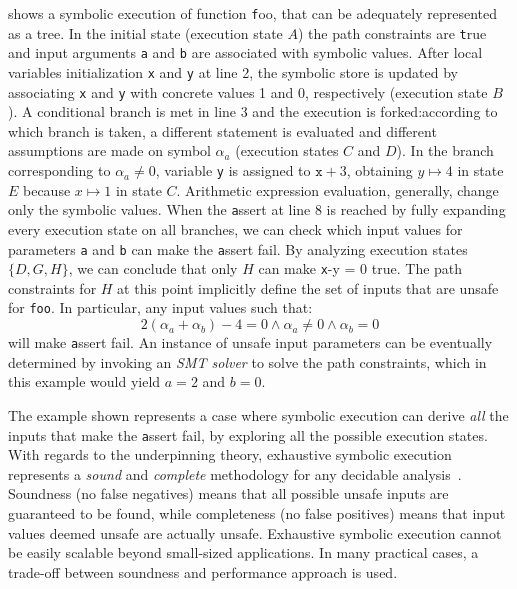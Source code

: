 \noindent {} shows a symbolic execution of function {\texttt foo}, that can be adequately represented as a tree. In the initial state (execution state $A$) the path constraints are {\texttt true} and input arguments {\texttt a} and {\texttt b} are associated with symbolic values. 
After local variables initialization {\texttt x} and {\texttt y} at line 2, the symbolic store is updated by associating {\texttt x} and {\texttt y} with concrete values 1 and 0, respectively (execution state $B$). A conditional branch is met in line 3 and the execution is forked:according to which branch is taken, a different statement is evaluated and different assumptions are made on symbol $\alpha_a$ (execution states $C$ and $D$). In the branch corresponding to $\alpha_a\neq 0$, variable {\texttt y} is assigned to  ${\texttt x}+3$, obtaining $y\mapsto 4$ in state $E$ because $x\mapsto 1$ in state $C$. Arithmetic expression evaluation, generally, change only the symbolic values.
When the {\texttt assert} at line 8 is reached by fully expanding every execution state  on all branches, we can check which input values for parameters {\texttt a} and {\texttt b} can make the {\texttt assert} fail. By analyzing execution states $\{D,G,H\}$, we can conclude that only $H$ can make {\texttt x-y = 0} true. The path constraints for $H$ at this point implicitly define the set of inputs that are unsafe for \texttt{foo}. 
In particular, any input values such that:
\[ 2(\alpha_a+\alpha_b)-4 = 0 \wedge \alpha_a \neq 0 \wedge \alpha_b = 0 \]
will make {\texttt assert} fail. An instance of unsafe input parameters can be eventually determined by invoking an {\em SMT solver}%
 to solve the path constraints, which in this example would yield $a = 2$ and $b = 0$.

The example shown represents a case where symbolic execution can derive {\em all} the inputs that make the {\texttt assert} fail, by exploring all the possible execution states. With regards to the underpinning theory, exhaustive symbolic execution represents a {\em sound} and {\em complete} methodology for any decidable analysis~\cite{Baldoni:2018:SSE:3212709.3182657}. Soundness (no false negatives) means that all possible unsafe inputs are guaranteed to be found, while completeness (no false positives) means that  input values deemed unsafe are actually unsafe. Exhaustive symbolic execution cannot be easily scalable beyond small-sized applications. In many practical cases, a trade-off between soundness and performance approach is used.
